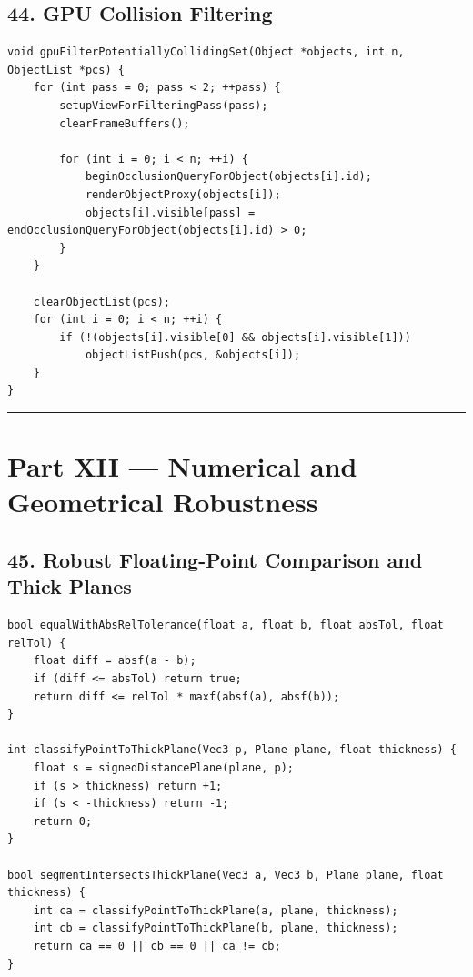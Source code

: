\documentclass[10pt,letterpaper]{article}
\begin{document}
\subsection*{44. GPU Collision Filtering}

\begin{verbatim}
void gpuFilterPotentiallyCollidingSet(Object *objects, int n, ObjectList *pcs) {
    for (int pass = 0; pass < 2; ++pass) {
        setupViewForFilteringPass(pass);
        clearFrameBuffers();

        for (int i = 0; i < n; ++i) {
            beginOcclusionQueryForObject(objects[i].id);
            renderObjectProxy(objects[i]);
            objects[i].visible[pass] = endOcclusionQueryForObject(objects[i].id) > 0;
        }
    }

    clearObjectList(pcs);
    for (int i = 0; i < n; ++i) {
        if (!(objects[i].visible[0] && objects[i].visible[1]))
            objectListPush(pcs, &objects[i]);
    }
}
\end{verbatim}

\medskip\hrule\medskip


\clearpage
{}
\section*{Part XII --- Numerical and Geometrical Robustness}


\subsection*{45. Robust Floating-Point Comparison and Thick Planes}

\begin{verbatim}
bool equalWithAbsRelTolerance(float a, float b, float absTol, float relTol) {
    float diff = absf(a - b);
    if (diff <= absTol) return true;
    return diff <= relTol * maxf(absf(a), absf(b));
}

int classifyPointToThickPlane(Vec3 p, Plane plane, float thickness) {
    float s = signedDistancePlane(plane, p);
    if (s > thickness) return +1;
    if (s < -thickness) return -1;
    return 0;
}

bool segmentIntersectsThickPlane(Vec3 a, Vec3 b, Plane plane, float thickness) {
    int ca = classifyPointToThickPlane(a, plane, thickness);
    int cb = classifyPointToThickPlane(b, plane, thickness);
    return ca == 0 || cb == 0 || ca != cb;
}
\end{verbatim}
\end{document}
